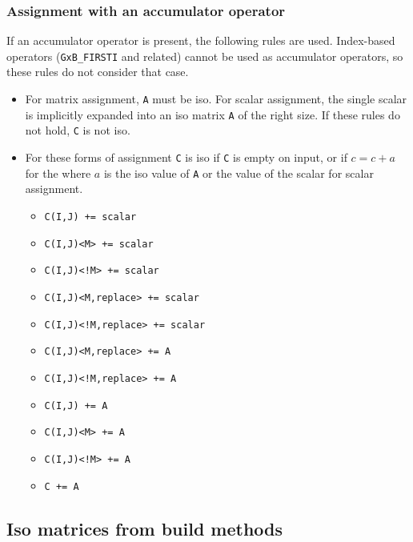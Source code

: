 \documentclass[12pt]{article}
\begin{document}
\subsubsection{Assignment with an accumulator operator}

If an accumulator operator is present, the following rules are used.
Index-based operators (\verb'GxB_FIRSTI' and related) cannot be used as
accumulator operators, so these rules do not consider that case.

\begin{itemize}
\item
For matrix assignment, \verb'A' must be iso.  For scalar assignment, the single
scalar is implicitly expanded into an iso matrix \verb'A' of the right size.
If these rules do not hold, \verb'C' is not iso.

\item For these forms of assignment \verb'C' is iso if \verb'C' is
empty on input, or if $c=c+a$ for the where $a$ is the iso value of \verb'A' or
the value of the scalar for scalar assignment.

                \begin{itemize}
                \item \verb'C(I,J) += scalar'
                \item \verb'C(I,J)<M> += scalar'
                \item \verb'C(I,J)<!M> += scalar'
                \item \verb'C(I,J)<M,replace> += scalar'
                \item \verb'C(I,J)<!M,replace> += scalar'
                \item \verb'C(I,J)<M,replace> += A'
                \item \verb'C(I,J)<!M,replace> += A'
                \item \verb'C(I,J) += A'
                \item \verb'C(I,J)<M> += A'
                \item \verb'C(I,J)<!M> += A '
                \item \verb'C += A'
                \end{itemize}
\end{itemize}

\subsection{Iso matrices from build methods}
\label{iso_build}
\end{document}
